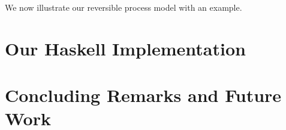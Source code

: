\documentclass[runningheads]{llncs}
\begin{document}
\noindent
We now illustrate our reversible process model with an example.


\section{Our Haskell Implementation}

\section{Concluding Remarks and Future Work}
%
%
%
 
 
%
\end{document}
